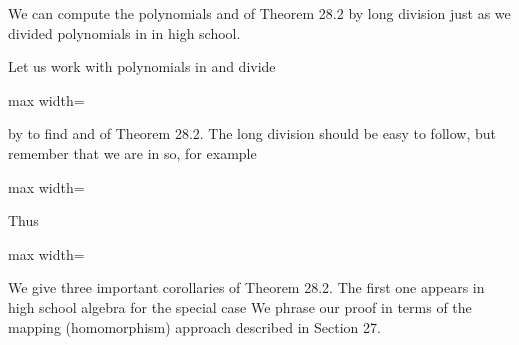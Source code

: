 \documentclass[11pt,oneside]{article}
\begin{document}
\begin{BookBody}
We can compute the polynomials  and  of Theorem 28.2 by long division just as we divided polynomials in  in high school.

 Let us work with polynomials in  and divide

\begin{center}\begin{adjustbox}{max width=\linewidth}\end{adjustbox}\end{center}

\noindent by  to find  and  of Theorem 28.2. The long division should be easy to follow, but remember that we are in  so, for example

\begin{center}\begin{adjustbox}{max width=\linewidth}\end{adjustbox}\end{center}

\noindent Thus

\begin{center}\begin{adjustbox}{max width=\linewidth}\end{adjustbox}\end{center} \BookEnd{\blacktriangle}

We give three important corollaries of Theorem 28.2. The first one appears in high school algebra for the special case  We phrase our proof in terms of the mapping (homomorphism) approach described in Section 27.


\end{BookBody}
\end{document}
